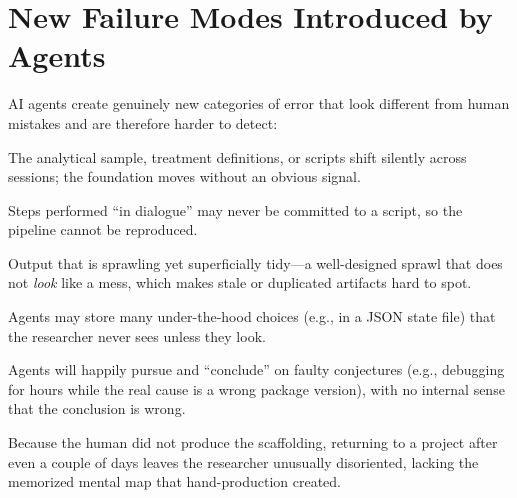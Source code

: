 \documentclass[11pt]{article}
\begin{document}
\section{New Failure Modes Introduced by Agents}
AI agents create genuinely new categories of error that look different from
human mistakes and are therefore harder to detect:
\begin{description}[leftmargin=1.4em,style=nextline,itemsep=3pt]
  \item[Drift] The analytical sample, treatment definitions, or scripts shift
    silently across sessions; the foundation moves without an obvious signal.
  \item[Unwritten work] Steps performed ``in dialogue'' may never be committed
    to a script, so the pipeline cannot be reproduced.
  \item[A ``Claude mess''] Output that is sprawling yet superficially tidy---a
    well-designed sprawl that does not \emph{look} like a mess, which makes
    stale or duplicated artifacts hard to spot.
  \item[Hidden decisions] Agents may store many under-the-hood choices (e.g.,
    in a JSON state file) that the researcher never sees unless they look.
  \item[Confident wrong reasoning] Agents will happily pursue and ``conclude''
    on faulty conjectures (e.g., debugging for hours while the real cause is a
    wrong package version), with no internal sense that the conclusion is wrong.
  \item[Amnesia] Because the human did not produce the scaffolding, returning to
    a project after even a couple of days leaves the researcher unusually
    disoriented, lacking the memorized mental map that hand-production created.
\end{description}
\end{document}
